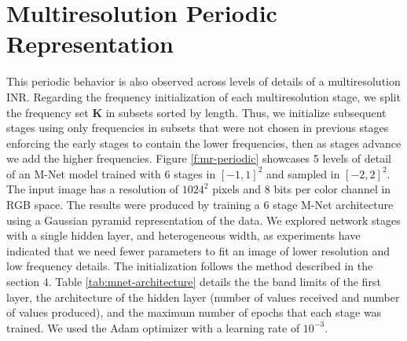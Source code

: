 



\section{Multiresolution Periodic Representation}


This periodic behavior is also observed across levels of details of a multiresolution INR. Regarding the frequency initialization of each multiresolution stage, we split the frequency set $\textbf{K}$ in subsets sorted by length. Thus, we initialize subsequent stages using only frequencies in subsets that were not chosen in previous stages enforcing the early stages to contain the lower frequencies, then as stages advance we add the higher frequencies.
Figure \ref{f:mr-periodic} showcases 5 levels of detail of an M-Net model trained with 6 stages in $[-1, 1]^2$ and sampled in $[-2, 2]^2$. The input image has a resolution of $1024^2$ pixels and $8$ bits per color channel in RGB space. The results were produced by training a $6$ stage M-Net architecture \cite{paz2022} using a Gaussian pyramid representation of the data. We explored network stages with a single hidden layer, and heterogeneous width, as experiments have indicated that we need fewer parameters to fit an image of lower resolution and low frequency details. The initialization follows the method described in the section 4. Table \ref{tab:mnet-architecture} details the the band limits of the first layer, the architecture of the hidden layer (number of values received and number of values produced), and the maximum number of epochs that each stage was trained. We used the Adam optimizer with a learning rate of $10^{-3}$.

